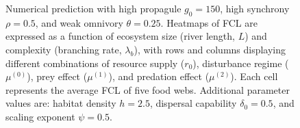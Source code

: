 \begin{figure}
\centering
{}
\caption{\label{fig:fig-num4}Numerical prediction with high propagule
\(g_0 = 150\), high synchrony \(\rho = 0.5\), and weak omnivory
\(\theta = 0.25\). Heatmaps of FCL are expressed as a function of
ecosystem size (river length, \(L\)) and complexity (branching rate,
\(\lambda_b\)), with rows and columns displaying different combinations
of resource supply (\(r_0\)), disturbance regime (\(\mu^{(0)}\)), prey
effect (\(\mu^{(1)}\)), and predation effect (\(\mu^{(2)}\)). Each cell
represents the average FCL of five food webs. Additional parameter
values are: habitat density \(h=2.5\), dispersal capability
\(\delta_0=0.5\), and scaling exponent \(\psi=0.5\).}
\end{figure}

\newpage

